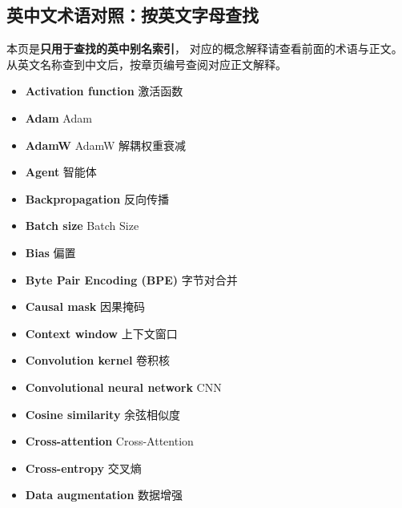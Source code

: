 \subsection{英中文术语对照：按英文字母查找}

本页是\textbf{只用于查找的英中别名索引}，
对应的概念解释请查看前面的术语与正文。
从英文名称查到中文后，按章页编号查阅对应正文解释。

\small
\begin{itemize}[leftmargin=1.2em,itemsep=2pt,topsep=3pt]
\item {\sffamily\bfseries Activation function} \quad 激活函数\quad {}
\item {\sffamily\bfseries Adam} \quad Adam\quad {}
\item {\sffamily\bfseries AdamW} \quad AdamW 解耦权重衰减\quad {}
\item {\sffamily\bfseries Agent} \quad 智能体\quad {}
\item {\sffamily\bfseries Backpropagation} \quad 反向传播\quad {}
\item {\sffamily\bfseries Batch size} \quad Batch Size\quad {}
\item {\sffamily\bfseries Bias} \quad 偏置\quad {}
\item {\sffamily\bfseries Byte Pair Encoding (BPE)} \quad 字节对合并\quad {}
\item {\sffamily\bfseries Causal mask} \quad 因果掩码\quad {}
\item {\sffamily\bfseries Context window} \quad 上下文窗口\quad {}
\item {\sffamily\bfseries Convolution kernel} \quad 卷积核\quad {}
\item {\sffamily\bfseries Convolutional neural network} \quad CNN\quad {}
\item {\sffamily\bfseries Cosine similarity} \quad 余弦相似度\quad {}
\item {\sffamily\bfseries Cross-attention} \quad Cross-Attention\quad {}
\item {\sffamily\bfseries Cross-entropy} \quad 交叉熵\quad {}
\item {\sffamily\bfseries Data augmentation} \quad 数据增强\quad {}

\end{itemize}
